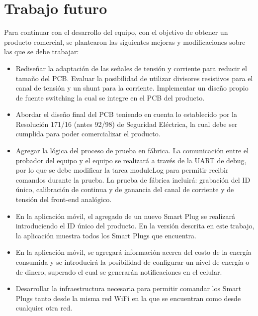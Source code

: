 \section{Trabajo futuro}
\label{sec:trabajo_futuro}

Para continuar con el desarrollo del equipo, con el objetivo de obtener un producto comercial, se plantearon las siguientes mejoras y modificaciones sobre las que se debe trabajar:

\begin{itemize}
\item Rediseñar la adaptación de las señales de tensión y corriente para reducir el tamaño del PCB. Evaluar la posibilidad de utilizar divisores resistivos para el canal de tensión y un shunt para la corriente. Implementar un diseño propio de fuente switching la cual se integre en el PCB del producto.
\item Abordar el diseño final del PCB teniendo en cuenta lo establecido por la Resolución 171/16 (antes 92/98) de Seguridad Eléctrica, la cual debe ser cumplida para poder comercializar el producto.
\item Agregar la lógica del proceso de prueba en fábrica. La comunicación entre el probador del equipo y el equipo se realizará a través de la UART de debug, por lo que se debe modificar la tarea moduleLog para permitir recibir comandos durante la prueba. La prueba de fábrica incluirá: grabación del ID único, calibración de continua y de ganancia del canal de corriente y de tensión del front-end analógico.
\item En la aplicación móvil, el agregado de un nuevo Smart Plug se realizará introduciendo el ID único del producto. En la versión descrita en este trabajo, la aplicación muestra todos los Smart Plugs que encuentra.
\item En la aplicación móvil, se agregará información acerca del costo de la energía consumida y se introducirá la posibilidad de configurar un nivel de energía o de dinero, superado el cual se generarán notificaciones en el celular.
\item Desarrollar la infraestructura necesaria para permitir comandar los Smart Plugs tanto desde la misma red WiFi en la que se encuentran como desde cualquier otra red.
\end{itemize}


